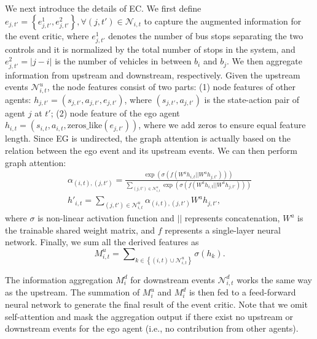 \documentclass{article}
\begin{document}
We next introduce the details of EC. We first define $e_{j,t'}=\left\{e^1_{j,t'},e^2_{j,t'}\right\}, \forall  \left(j,t'\right)\in \mathcal{N}_{i,t} $ to capture the augmented information for the event critic, where $e^1_{j,t'}$ denotes the number of bus stops separating the two controls and it is normalized by the total number of stops in the system, and $e^2_{j,t'}=|j-i|$ is the number of vehicles in between $b_i$ and $b_j$. We then aggregate information from upstream and downstream, respectively. %
Given the upstream events $\mathcal{N}^u_{i,t}$, the node features consist of two parts: (1) node features of other agents:  $h_{j,t'} = \left(s_{j,t'},a_{j,t'},e_{j,t'} \right)$, where $\left(s_{j,t'},a_{j,t'}\right)$ is the state-action pair of agent $j$ at $t'$; (2) node feature of the ego agent $h_{i,t}=\left(s_{i,t},a_{i,t},\text{zeros\_like}\left(e_{j,t'}\right) \right)$, where we add zeros to ensure equal feature length. Since EG is undirected, the graph attention is actually based on the relation between the ego event and its upstream events. We can then perform graph attention:
\begin{gather}
 \alpha_{(i,t),(j,t')}=\frac{\exp\left(\sigma\left(f\left(W^ah_{i,t}|| W^ah_{j,t'}\right)\right)\right)}{\sum_{\left(j,t'\right)\in \mathcal{N}^u_{i,t}}\exp\left(\sigma\left(f\left(W^ah_{i,t}||W^ah_{j,t'}\right)\right)\right) }
\label{eq:att}\\
 h'_{i,t} = \sum\nolimits_{\left(j,t'\right)\in \mathcal{N}^u_{i,t}} \alpha_{(i,t),(j,t')} W^ah_{j,t'},
\label{eq:ego}
\end{gather}
where $\sigma$ is non-linear activation function and $||$ represents concatenation, $W^a$ is the trainable shared weight matrix, and $f$ represents a single-layer neural network. Finally, we sum all the derived features as
\begin{equation}
 M^u_{i,t} = \sum\nolimits_{k \in \left\{ \left(i,t\right) \cup \mathcal{N}^u_{i,t}\right\}} \sigma \left( h_{k} \right).
\label{eq:sum}
\end{equation}

The information aggregation $M^d_i$ for downstream events $\mathcal{N}^d_{i,t}$ works the same way as the upstream.
The summation of $M^u_i$ and $M^d_i$ is then fed to a feed-forward neural network to generate the final result of the event critic. Note that we omit self-attention and mask the aggregation output if there exist no upstream or downstream events for the ego agent (i.e., no contribution from other agents).
\end{document}
